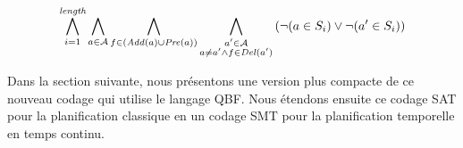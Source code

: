 
\begin{small}
\[
\bigwedge\limits_{\substack{i=1}}^{\textit{length}}\bigwedge\limits_{\substack{\substack{a\in \mathcal{A}}}}\bigwedge\limits_{\substack{\substack{f\in \left(\mathit{Add}(a)\cup\mathit{Pre}(a)\right)}}}\bigwedge\limits_{\substack{\substack{a'\in \mathcal{A}\\a \neq a' \wedge f \in \mathit{Del}(a')}}}\left(\neg (a \in S_{i}) \vee \neg (a' \in S_{i})\right)
\]
\end{small}


Dans la section suivante, nous présentons une version plus compacte de ce nouveau codage qui utilise le langage QBF. Nous étendons ensuite ce codage SAT pour la planification classique en un codage SMT pour la planification temporelle en temps continu.
